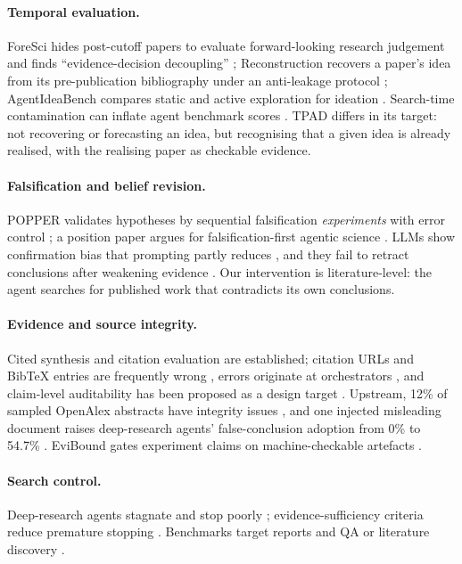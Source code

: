 \paragraph{Temporal evaluation.} ForeSci hides post-cutoff papers to evaluate forward-looking research judgement and finds ``evidence-decision decoupling'' \citep{tian2026foresci}; Reconstruction recovers a paper's idea from its pre-publication bibliography under an anti-leakage protocol \citep{chen2026reconstruction}; AgentIdeaBench compares static and active exploration for ideation \citep{mo2026agentideabench}. Search-time contamination can inflate agent benchmark scores \citep{wang2026searchtime}. TPAD differs in its target: not recovering or forecasting an idea, but recognising that a given idea is already realised, with the realising paper as checkable evidence.

\paragraph{Falsification and belief revision.} POPPER validates hypotheses by sequential falsification \emph{experiments} with error control \citep{huang2025automated}; a position paper argues for falsification-first agentic science \citep{fa2026sound}. LLMs show confirmation bias that prompting partly reduces \citep{jhaveri2026failing}, and they fail to retract conclusions after weakening evidence \citep{sadhu2026derelab}. Our intervention is literature-level: the agent searches for published work that contradicts its own conclusions.

\paragraph{Evidence and source integrity.} Cited synthesis \citep{skarlinski2024language,asai2024openscholar} and citation evaluation \citep{gao2023enabling} are established; citation URLs and BibTeX entries are frequently wrong \citep{rao2026detecting,rao2026bibtex,reizinger2026hallmark}, errors originate at orchestrators \citep{hirsch2026who}, and claim-level auditability has been proposed as a design target \citep{rasheed2026from}. Upstream, 12\% of sampled OpenAlex abstracts have integrity issues \citep{kim2026one}, and one injected misleading document raises deep-research agents' false-conclusion adoption from 0\% to 54.7\% \citep{zhu2026is}. EviBound gates experiment claims on machine-checkable artefacts \citep{chen2025evidencebound}.

\paragraph{Search control.} Deep-research agents stagnate and stop poorly \citep{soudani2026when,zhang2026to,liu2026diagnosing}; evidence-sufficiency criteria reduce premature stopping \citep{choubey2026dont}. Benchmarks target reports and QA \citep{du2025deepresearch,zhong2026draco,xie2026dreval} or literature discovery \citep{xiong2026autoresearchbench}.
